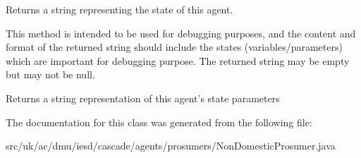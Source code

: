 Returns a string representing the state of this agent. 

This method is intended to be used for debugging purposes, and the content and format of the returned string should include the states (variables/parameters) which are important for debugging purpose. The returned string may be empty but may not be {\ttfamily null}.

\begin{DoxyReturn}{Returns}
a string representation of this agent's state parameters 
\end{DoxyReturn}


The documentation for this class was generated from the following file\-:\begin{DoxyCompactItemize}
\item 
src/uk/ac/dmu/iesd/cascade/agents/prosumers/Non\-Domestic\-Prosumer.\-java\end{DoxyCompactItemize}
